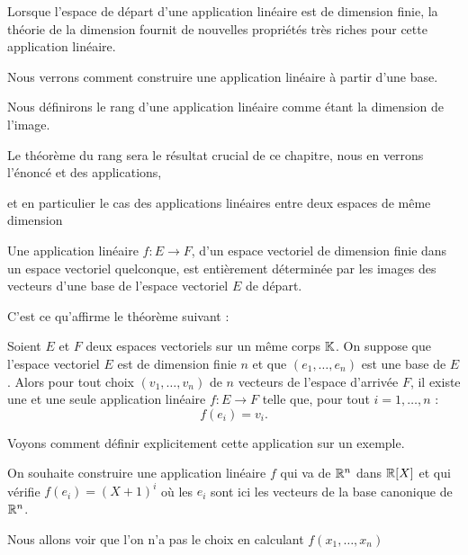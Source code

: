 







\debuttexte


\diapo

\change
Lorsque l'espace de départ d'une application linéaire est de dimension finie,
la théorie de la dimension fournit de nouvelles propriétés très
riches pour cette application linéaire.

\change
Nous verrons comment construire une application linéaire
à partir d'une base.

\change
Nous définirons le rang d'une application linéaire comme étant la dimension de l'image.

\change
Le théorème du rang sera le résultat crucial de ce chapitre, nous en verrons
l'énoncé et des applications,

\change
et en particulier le cas des applications linéaires 
entre deux espaces de même dimension

\diapo

Une application linéaire $f : E \to F$, d'un espace vectoriel de dimension finie dans un 
espace vectoriel quelconque, est entièrement déterminée par les 
images des vecteurs d'une base de l'espace vectoriel $E$ de départ.

\change
C'est ce qu'affirme le théorème suivant :

Soient $E$ et $F$ deux espaces vectoriels sur un même corps $\mathbb{K}$.
On suppose que l'espace vectoriel $E$ est de dimension finie $n$
et que $(e_1,\dots,e_n)$ est une base de $E$.
Alors pour tout choix $(v_1, \ldots ,v_n)$ 
de $n$ vecteurs de l'espace d'arrivée $F$, il existe une et une seule application linéaire $f : E \to F$
 telle que, pour tout $i=1,\ldots,n$ :
$$f(e_i)=v_i.$$

\change
Voyons comment définir explicitement cette application sur un exemple.

On souhaite construire une application linéaire $f$ qui va de $\mathbb{R}^n$ dans 
$\mathbb{R}[X]$ et qui vérifie $f(e_i) = (X+1)^i$ où les $e_i$ sont ici les vecteurs 
de la base canonique de $\mathbb{R}^n$.

\change
Nous allons voir que l'on n'a pas le choix en calculant $f(x_1,\ldots,x_n)$

